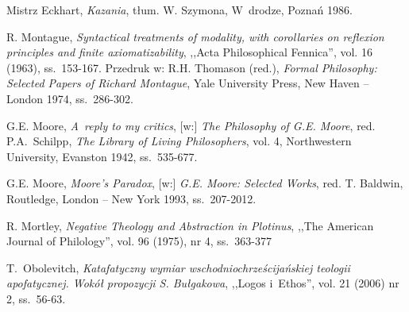 \begin{thebibliography}{100}


Mistrz Eckhart, \textit{Kazania}, tłum. W. Szymona, W~drodze, Poznań 1986.

R. Montague, \textit{Syntactical treatments of modality, with corollaries on reflexion principles and finite axiomatizability}, ,,Acta Philosophical Fennica'', vol. 16 (1963), ss.~153-167.
Przedruk w: R.H. Thomason (red.), \textit{Formal Philosophy: Selected Papers of Richard Montague}, Yale University Press, New Haven -- London 1974, ss.~286-302.

G.E. Moore, \textit{A~reply to my critics}, [w:] \textit{The Philosophy of G.E. Moore}, red. P.A.~Schilpp,
\textit{The Library of Living Philosophers}, vol. 4, Northwestern University, Evanston 1942, ss.~535-677.

G.E. Moore, \textit{Moore's Paradox}, [w:] \textit{G.E. Moore: Selected Works}, red. T. Baldwin, Routledge, London -- New York 1993, ss.~207-2012.

R. Mortley, \textit{Negative Theology and Abstraction in Plotinus}, ,,The American Journal of Philology'', vol. 96 (1975), nr 4, ss.~363-377



T.~Obolevitch, \textit{Katafatyczny wymiar wschodniochrześcijańskiej teologii apofatycznej. Wokół propozycji S. Bułgakowa}, ,,Logos i~Ethos'', vol. 21 (2006) nr 2, ss.~56-63.


\end{thebibliography}
